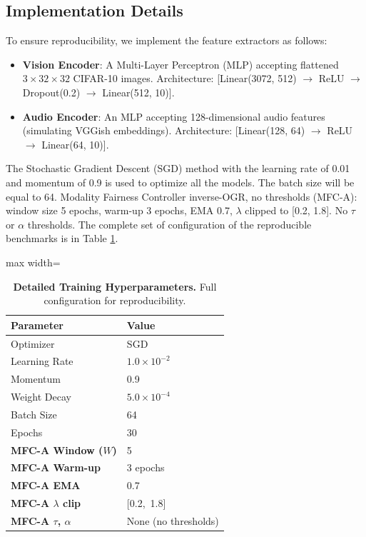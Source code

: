 \documentclass[preprint,a4paper, 10pt, 5p]{elsarticle}
\begin{document}
\subsection{Implementation Details}
To ensure reproducibility, we implement the feature extractors as follows:
\begin{itemize}
    \item \textbf{Vision Encoder}: A Multi-Layer Perceptron (MLP) accepting flattened $3 \times 32 \times 32$ CIFAR-10 images. Architecture: [Linear(3072, 512) $\rightarrow$ ReLU $\rightarrow$ Dropout(0.2) $\rightarrow$ Linear(512, 10)].
    \item \textbf{Audio Encoder}: An MLP accepting 128-di\-men\-sional audio features (simulating VGGish embeddings). Architecture: [Linear(128, 64) $\rightarrow$ ReLU $\rightarrow$ Linear(64, 10)].
\end{itemize}
The Stochastic Gradient Descent (SGD) method with the learning rate of 0.01 and momentum of 0.9 is used to optimize all the models. The batch size will be equal to 64. Modality Fairness Controller inverse-OGR, no thresholds (MFC-A):  window size 5 epochs, warm-up 3 epochs, EMA 0.7, $\lambda$ clipped to [0.2, 1.8]. No $\tau$ or $\alpha$ thresholds. The complete set of configuration of the reproducible benchmarks is in Table \ref{tab:hyperparams_main}.

\begin{table}[h]
\caption{\textbf{Detailed Training Hyperparameters.} Full configuration for reproducibility.}
\label{tab:hyperparams_main}
\centering
\begin{adjustbox}{max width=\linewidth}\begin{tabular}{@{}ll@{}}
\toprule
\textbf{Parameter} & \textbf{Value} \\ \midrule
Optimizer & SGD \\
Learning Rate & $1.0 \times 10^{-2}$ \\
Momentum & 0.9 \\
Weight Decay & $5.0 \times 10^{-4}$ \\
Batch Size & 64 \\
Epochs & 30 \\
\textbf{MFC-A Window ($W$)} & 5 \\
\textbf{MFC-A Warm-up} & 3 epochs \\
\textbf{MFC-A EMA} & 0.7 \\
\textbf{MFC-A $\lambda$ clip} & [0.2,\ 1.8] \\
\textbf{MFC-A $\tau$, $\alpha$} & None (no thresholds) \\ \bottomrule
\end{tabular}\end{adjustbox}
\end{table}
\end{document}
